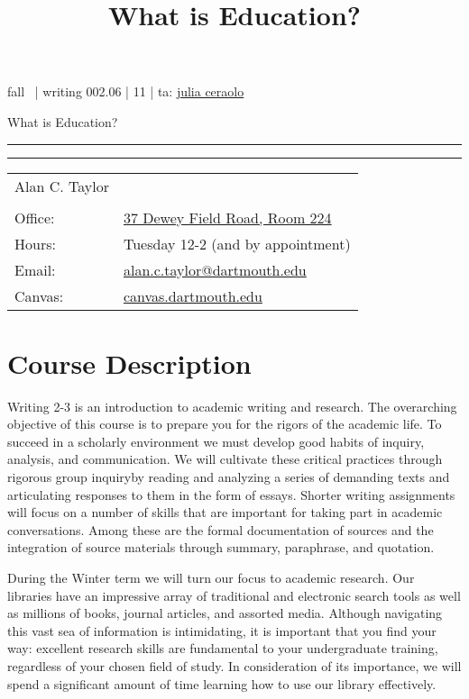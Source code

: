 \documentclass[letterpaper]{article}
\title{What is Education?}
\date{}
\makeatletter
\def\myaddress{37 Dewey Field Road, Room 224 }
\def\myemail{\href{mailto:alan.c.taylor@dartmouth.edu}{alan.c.taylor@dartmouth.edu}}
\def\myweb{www.opensourcewriting.org}
\def\myofficehours{Tuesday 12-2 (and by appointment) }
\def\mytime{11 }
\def\mysection{.06 }
\def\mytitle{What is Education?}
\def\myta{\href{mailto:julia.s.ceraolo.gr@dartmouth.edu}{julia ceraolo}}
\makeatother
\begin{document}
{\specialfont {}  fall \the\year\ | writing 002\mysection | \mytime | ta: \myta}
\vspace{1cm}

{\Huge \mytitle}

\textcolor{SteelGray!60}{\hrule}

\textcolor{Ahrenge!60}{\hrule}


\bigskip

\begin{tabular}{ll}
{\Large Alan C. Taylor} & \\
& \\
Office: & {\href{https://goo.gl/maps/5ACU6kGcqv7JcAzf7}{\myaddress}} \\
Hours: & \myofficehours \\
Email: & \myemail \\
Canvas: & \href{https://canvas.dartmouth.edu}{canvas.dartmouth.edu} \\

\end{tabular}

\section*{Course Description}

Writing 2-3 is an introduction to academic writing and research. The overarching objective of this course is to prepare you for the rigors of the academic life. To succeed in a scholarly environment we must develop good habits of inquiry, analysis, and communication. We will cultivate these critical practices through rigorous group inquiry\textemdash by reading and analyzing a series of demanding texts and articulating responses to them in the form of essays. Shorter writing assignments will focus on a number of skills that are important for taking part in academic conversations. Among these are the formal documentation of sources and the integration of source materials through summary, paraphrase, and quotation. 

During the Winter term we will turn our focus to academic research. Our libraries have an impressive array of traditional and electronic search tools as well as millions of books, journal articles, and assorted media. Although navigating this vast sea of information is intimidating, it is important that you find your way: excellent research skills are fundamental to your undergraduate training, regardless of your chosen field of study. In consideration of its importance, we will spend a significant amount of time learning how to use our library effectively. 
\end{document}
